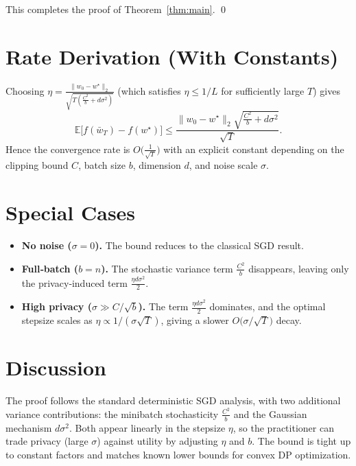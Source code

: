 \documentclass{article}
\newcommand{\E}{\mathbb{E}}
\begin{document}
This completes the proof of Theorem~\ref{thm:main}. \qed

\section*{Rate Derivation (With Constants)}
Choosing $\eta = \frac{\|w_0-w^\star\|_2}{\sqrt{T\left(\frac{C^2}{b}+d\sigma^2\right)}}$ (which satisfies $\eta\le 1/L$ for sufficiently large $T$) gives
\[
\E\!\big[f(\bar w_T)-f(w^\star)\big]
\le
\frac{\|w_0-w^\star\|_2\sqrt{\frac{C^2}{b}+d\sigma^2}}{\sqrt{T}} .
\]
Hence the convergence rate is $O\!\big(\tfrac{1}{\sqrt{T}}\big)$ with an explicit constant depending on the clipping bound $C$, batch size $b$, dimension $d$, and noise scale $\sigma$.

\section*{Special Cases}
\begin{itemize}
\item \textbf{No noise ($\sigma=0$).} The bound reduces to the classical SGD result.
\item \textbf{Full‑batch ($b=n$).} The stochastic variance term $\frac{C^2}{b}$ disappears, leaving only the privacy‑induced term $\frac{\eta d\sigma^2}{2}$.
\item \textbf{High privacy ($\sigma\gg C/\sqrt{b}$).} The term $\frac{\eta d\sigma^2}{2}$ dominates, and the optimal stepsize scales as $\eta\propto 1/(\sigma\sqrt{T})$, giving a slower $O\big(\sigma/\sqrt{T}\big)$ decay.
\end{itemize}

\section*{Discussion}
The proof follows the standard deterministic SGD analysis, with two additional variance contributions:
the minibatch stochasticity $\frac{C^2}{b}$ and the Gaussian mechanism $d\sigma^2$.
Both appear linearly in the stepsize $\eta$, so the practitioner can trade privacy (large $\sigma$) against utility by adjusting $\eta$ and $b$.
The bound is tight up to constant factors and matches known lower bounds for convex DP optimization.
\end{document}
